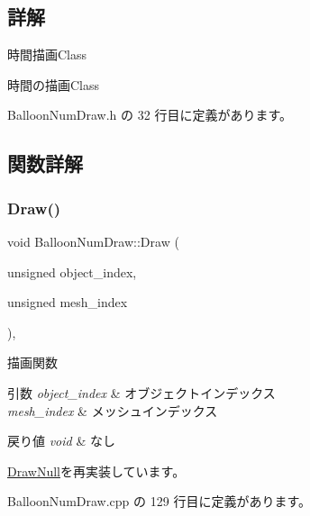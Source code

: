 \subsection{詳解}
時間描画\+Class 

時間の描画\+Class 

 Balloon\+Num\+Draw.\+h の 32 行目に定義があります。



\subsection{関数詳解}
\mbox{\label{class_balloon_num_draw_ae4477e10f6ac54beb64b1f2f85f6d2d1}} 
\subsubsection{\texorpdfstring{Draw()}{Draw()}}
{\footnotesize\ttfamily void Balloon\+Num\+Draw\+::\+Draw (\begin{DoxyParamCaption}\item[{unsigned}]{object\+\_\+index,  }\item[{unsigned}]{mesh\+\_\+index }\end{DoxyParamCaption})\hspace{0.3cm}{\ttfamily [override]}, {\ttfamily [virtual]}}



描画関数 


\begin{DoxyParams}{引数}
{\em object\+\_\+index} & オブジェクトインデックス \\
\hline
{\em mesh\+\_\+index} & メッシュインデックス \\
\hline
\end{DoxyParams}

\begin{DoxyRetVals}{戻り値}
{\em void} & なし \\
\hline
\end{DoxyRetVals}


\mbox{\hyperlink{class_draw_null_a72ac0b7dc40b1469582419dcc5b0e114}{Draw\+Null}}を再実装しています。



 Balloon\+Num\+Draw.\+cpp の 129 行目に定義があります。

\mbox{\label{class_balloon_num_draw_ac9fbbdb35976d81abb6d4b9ce0c128f3}} 
